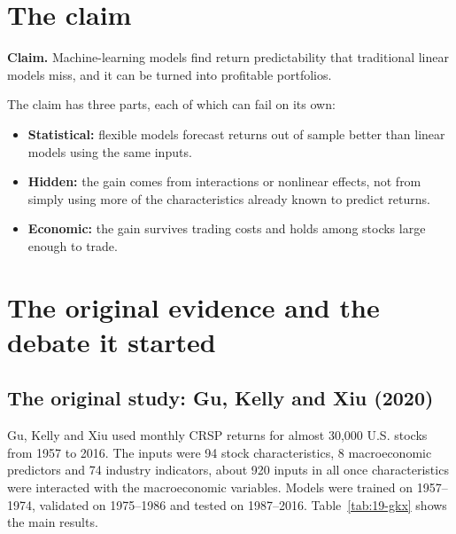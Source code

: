 \section{The claim}
\label{sec:19-claim}

\begin{callout}
\textbf{Claim.} Machine-learning models find return predictability that traditional linear models miss, and it can be turned into profitable portfolios.
\end{callout}

The claim has three parts, each of which can fail on its own:

\begin{itemize}
  \item \textbf{Statistical:} flexible models forecast returns out of sample better than linear models using the same inputs.
  \item \textbf{Hidden:} the gain comes from interactions or nonlinear effects, not from simply using more of the characteristics already known to predict returns.
  \item \textbf{Economic:} the gain survives trading costs and holds among stocks large enough to trade.
\end{itemize}


\section{The original evidence and the debate it started}
\label{sec:19-evidence}

\subsection{The original study: Gu, Kelly and Xiu (2020)}

Gu, Kelly and Xiu used monthly CRSP returns for almost 30,000 U.S. stocks from 1957 to 2016. The inputs were 94 stock characteristics, 8 macroeconomic predictors and 74 industry indicators, about 920 inputs in all once characteristics were interacted with the macroeconomic variables. Models were trained on 1957--1974, validated on 1975--1986 and tested on 1987--2016. Table~\ref{tab:19-gkx} shows the main results.


